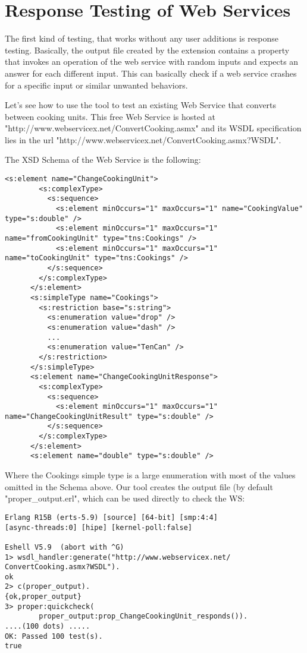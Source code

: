 \documentclass[submission,copyright,a4]{eptcs}
\begin{document}
\section{Response Testing of Web Services}

The first kind of testing, that works without any user additions is response testing. Basically, the output file created by the extension contains a property that invokes an operation of the web service with random inputs and expects an answer for each different input. This can basically check if a web service crashes for a specific input or similar unwanted behaviors. 

Let's see how to use the tool to test an existing Web Service that converts between cooking units. This free Web Service is hosted at "http://www.webservicex.net/ConvertCooking.asmx" and its WSDL specification lies in the url "http://www.webservicex.net/ConvertCooking.asmx?WSDL". 

The XSD Schema of the Web Service is the following:

\begin{lstlisting}
<s:element name="ChangeCookingUnit">
        <s:complexType>
          <s:sequence>
            <s:element minOccurs="1" maxOccurs="1" name="CookingValue" type="s:double" />
            <s:element minOccurs="1" maxOccurs="1" name="fromCookingUnit" type="tns:Cookings" />
            <s:element minOccurs="1" maxOccurs="1" name="toCookingUnit" type="tns:Cookings" />
          </s:sequence>
        </s:complexType>
      </s:element>
      <s:simpleType name="Cookings">
        <s:restriction base="s:string">
          <s:enumeration value="drop" />
          <s:enumeration value="dash" />
          ...
          <s:enumeration value="TenCan" />
        </s:restriction>
      </s:simpleType>
      <s:element name="ChangeCookingUnitResponse">
        <s:complexType>
          <s:sequence>
            <s:element minOccurs="1" maxOccurs="1" name="ChangeCookingUnitResult" type="s:double" />
          </s:sequence>
        </s:complexType>
      </s:element>
      <s:element name="double" type="s:double" />
\end{lstlisting}

Where the Cookings simple type is a large enumeration with most of the values omitted in the Schema above. Our tool creates the output file (by default "proper\_output.erl", which can be used directly to check the WS:

\begin{lstlisting}
Erlang R15B (erts-5.9) [source] [64-bit] [smp:4:4] 
[async-threads:0] [hipe] [kernel-poll:false]

Eshell V5.9  (abort with ^G)
1> wsdl_handler:generate("http://www.webservicex.net/
ConvertCooking.asmx?WSDL").
ok
2> c(proper_output).
{ok,proper_output}
3> proper:quickcheck(
        proper_output:prop_ChangeCookingUnit_responds()).
....(100 dots) .....
OK: Passed 100 test(s).
true
\end{lstlisting}
\end{document}
